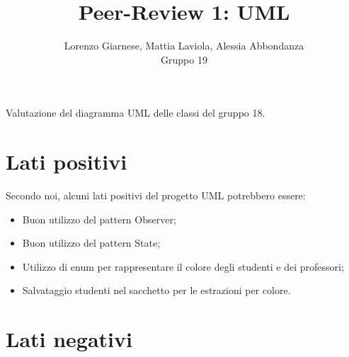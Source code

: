 \documentclass[12pt]{article}
\title{Peer-Review 1: UML}
\author{Lorenzo Giarnese, Mattia Laviola, Alessia Abbondanza \\Gruppo 19}
\begin{document}
\maketitle

Valutazione del diagramma UML delle classi del gruppo 18.

\section{Lati positivi}

Secondo noi, alcuni lati positivi del progetto UML potrebbero essere: \begin{itemize}\item Buon utilizzo del pattern Observer; \item Buon utilizzo del pattern State; \item Utilizzo di enum per rappresentare il colore degli studenti e dei professori; \item Salvataggio studenti nel sacchetto per le estrazioni per colore.\end{itemize}

\section{Lati negativi}
\end{document}

